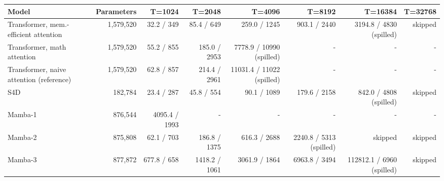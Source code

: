 \begin{tabular}{lrrrrrrr}
\toprule
Model & Parameters & T=1024 & T=2048 & T=4096 & T=8192 & T=16384 & T=32768 \\
\midrule
Transformer, mem.-efficient attention & 1,579,520 & 32.2 / 349 & 85.4 / 649 & 259.0 / 1245 & 903.1 / 2440 & 3194.8 / 4830 (spilled) & skipped \\
Transformer, math attention & 1,579,520 & 55.2 / 855 & 185.0 / 2953 & 7778.9 / 10990 (spilled) & - & - & - \\
Transformer, naive attention (reference) & 1,579,520 & 62.8 / 857 & 214.4 / 2961 & 11031.4 / 11022 (spilled) & - & - & - \\
S4D & 182,784 & 23.4 / 287 & 45.8 / 554 & 90.1 / 1089 & 179.6 / 2158 & 842.0 / 4808 (spilled) & skipped \\
Mamba-1 & 876,544 & 4095.4 / 1993 & - & - & - & - & - \\
Mamba-2 & 875,808 & 62.1 / 703 & 186.8 / 1375 & 616.3 / 2688 & 2240.8 / 5313 (spilled) & skipped & skipped \\
Mamba-3 & 877,872 & 677.8 / 658 & 1418.2 / 1061 & 3061.9 / 1864 & 6963.8 / 3494 & 112812.1 / 6960 (spilled) & skipped \\
\bottomrule
\end{tabular}
\par{}

